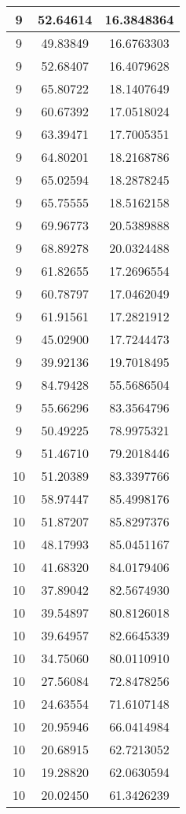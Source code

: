 \documentclass[
]{book}
\begin{document}
\begin{tabular}{c|c|c}
\hline
9 & 52.64614 & 16.3848364\\
\hline
9 & 49.83849 & 16.6763303\\
\hline
9 & 52.68407 & 16.4079628\\
\hline
9 & 65.80722 & 18.1407649\\
\hline
9 & 60.67392 & 17.0518024\\
\hline
9 & 63.39471 & 17.7005351\\
\hline
9 & 64.80201 & 18.2168786\\
\hline
9 & 65.02594 & 18.2878245\\
\hline
9 & 65.75555 & 18.5162158\\
\hline
9 & 69.96773 & 20.5389888\\
\hline
9 & 68.89278 & 20.0324488\\
\hline
9 & 61.82655 & 17.2696554\\
\hline
9 & 60.78797 & 17.0462049\\
\hline
9 & 61.91561 & 17.2821912\\
\hline
9 & 45.02900 & 17.7244473\\
\hline
9 & 39.92136 & 19.7018495\\
\hline
9 & 84.79428 & 55.5686504\\
\hline
9 & 55.66296 & 83.3564796\\
\hline
9 & 50.49225 & 78.9975321\\
\hline
9 & 51.46710 & 79.2018446\\
\hline
10 & 51.20389 & 83.3397766\\
\hline
10 & 58.97447 & 85.4998176\\
\hline
10 & 51.87207 & 85.8297376\\
\hline
10 & 48.17993 & 85.0451167\\
\hline
10 & 41.68320 & 84.0179406\\
\hline
10 & 37.89042 & 82.5674930\\
\hline
10 & 39.54897 & 80.8126018\\
\hline
10 & 39.64957 & 82.6645339\\
\hline
10 & 34.75060 & 80.0110910\\
\hline
10 & 27.56084 & 72.8478256\\
\hline
10 & 24.63554 & 71.6107148\\
\hline
10 & 20.95946 & 66.0414984\\
\hline
10 & 20.68915 & 62.7213052\\
\hline
10 & 19.28820 & 62.0630594\\
\hline
10 & 20.02450 & 61.3426239\\

\end{tabular}
\end{document}
